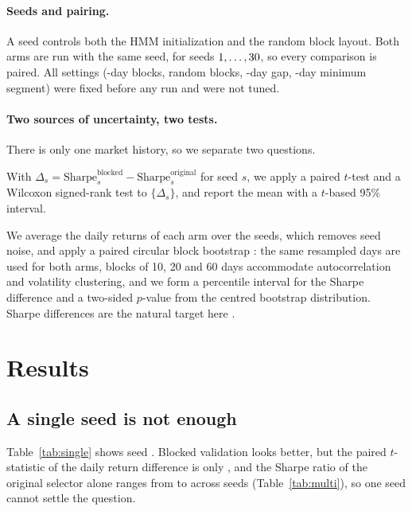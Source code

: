 \documentclass[11pt]{article}
\begin{document}
\paragraph{Seeds and pairing.} A seed controls both the HMM initialization and the random block layout. Both arms are run with the same seed, for seeds $1,\dots,30{}$, so every comparison is paired. All settings (\BlockLen{}-day blocks, \RandomBlocks{} random blocks, \GapDays{}-day gap, \MinSegment{}-day minimum segment) were fixed before any run and were not tuned.

\paragraph{Two sources of uncertainty, two tests.} There is only one market history, so we separate two questions.
\begin{description}[style=nextline]
  \item[Robustness to algorithmic randomness.] With $\Delta_s=\text{Sharpe}^{\text{blocked}}_s-\text{Sharpe}^{\text{original}}_s$ for seed $s$, we apply a paired $t$-test and a Wilcoxon signed-rank test \cite{wilcoxon1945} to $\{\Delta_s\}$, and report the mean with a $t$-based 95\% interval.
  \item[Robustness to the market sample.] We average the daily returns of each arm over the \NSeeds{} seeds, which removes seed noise, and apply a paired circular block bootstrap \cite{politisromano1992}: the same resampled days are used for both arms, blocks of 10, 20 and 60 days accommodate autocorrelation and volatility clustering, and we form a percentile interval for the Sharpe difference and a two-sided $p$-value from the centred bootstrap distribution. Sharpe differences are the natural target here \cite{ledoitwolf2008}.
\end{description}

\section{Results}\label{sec:results}

\subsection{A single seed is not enough}

Table~\ref{tab:single} shows seed \SingleSeed{}. Blocked validation looks better, but the paired $t$-statistic of the daily return difference is only \OneSeedT{}, and the Sharpe ratio of the original selector alone ranges from \SeedBaseSharpeMin{} to \SeedBaseSharpeMax{} across seeds (Table~\ref{tab:multi}), so one seed cannot settle the question.
\end{document}
